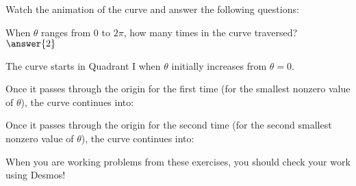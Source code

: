 \documentclass{ximera}
\begin{document}
\begin{exercise}
\begin{exercise}
Watch the animation of the curve and answer the following questions:

When $\theta$ ranges from $0$ to $2\pi$, how many times in the curve traversed? $\answer{2}$

The curve starts in Quadrant I when $\theta$ initially increases from $\theta =0$.  

Once it  passes through the origin for the first time (for the smallest nonzero value of $\theta$), the curve continues into:
\begin{multipleChoice}
\end{multipleChoice}

Once it passes through the origin for the second time (for the second smallest nonzero value of $\theta$), the curve continues into:
\begin{multipleChoice}
\end{multipleChoice}

 \begin{remark}
When you are working problems from these exercises, you should check your work using Desmos!
\end{remark}

\end{exercise}
\end{exercise}
\end{document}
